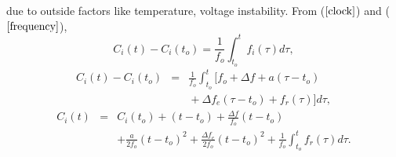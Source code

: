 \documentclass[journal]{IEEEtran}
\begin{document}
due to outside factors like temperature, voltage instability. \newline
From ($\ref{clock}$) and ($\ref{frequency}$),
\begin{equation}
C_i(t) - C_i(t_o) = \frac{1}{f_o} \int^{t}_{t_o}f_i(\tau)d\tau ,
\end{equation}
\begin{eqnarray*}
C_i(t) - C_i(t_o) & = & \frac{1}{f_o} \int^{t}_{t_o}{[f_o + \Delta f + a(\tau-t_o)  } \\
 &  & {} + \Delta f_e(\tau-t_o) + f_r(\tau)]d\tau ,
\label{fasika}
\end{eqnarray*}
\begin{eqnarray*}
C_i(t) & = & C_i(t_o) + (t-t_o) +\frac{\Delta f}{f_o}(t-t_o) \\
& & + \frac{a}{2f_o}(t-t_o)^2 + \frac{\Delta f_e}{2f_o}(t-t_o)^2 +
\frac{1}{f_o}\int^{t}_{t_o}{f_r(\tau)d\tau} .
\end{eqnarray*}
\end{document}
